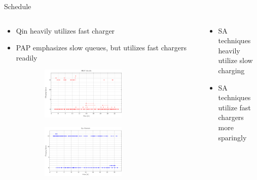 \documentclass[aspectratio=169]{beamer}
\begin{document}
\begin{frame}[label={sec:org44faa18}]{Schedule}
\begin{columns}
\begin{column}{0.5\columnwidth}
{\scriptsize
\begin{itemize}
\item Qin heavily utilizes fast charger
\item PAP emphasizes slow queues, but utilizes fast chargers readily
\end{itemize}
}

\begin{figure}
\begin{subfigure}[t]{\textwidth}
\centering
    \includegraphics[width=0.7\textwidth]{img/sa-pap-paper-good/schedule-milp}
\end{subfigure}
\begin{subfigure}[t]{\textwidth}
\centering
    \includegraphics[width=0.7\textwidth]{img/sa-pap-paper-good/schedule-qin}
\end{subfigure}
\end{figure}
\end{column}

\begin{column}{0.5\columnwidth}
{\scriptsize
\begin{itemize}
\item SA techniques heavily utilize slow charging
\item SA techniques utilize fast chargers more sparingly
\end{itemize}
}


\end{column}
\end{columns}
\end{frame}
\end{document}
